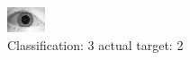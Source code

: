 \begin{figure}[h!]
\begin{center}
\includegraphics[width=0.60\columnwidth]{figures/ID1612_class_3_target_2.png}
\end{center}
\caption{ Classification: 3 actual target: 2}
\label{fig:ID1612_class_3_target_2}
\end{figure}
